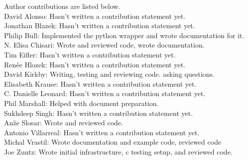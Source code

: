 Author contributions are listed below. \\
David Alonso: Hasn't written a contribution statement yet. \\
Jonathan Blazek: Hasn't written a contribution statement yet. \\
Philip Bull: Implemented the python wrapper and wrote documentation for it. \\
N. Elisa Chisari: Wrote and reviewed code, wrote documentation. \\
Tim Eifler: Hasn't written a contribution statement yet. \\
Ren\'ee Hlozek: Hasn't written a contribution statement yet. \\
David Kirkby: Writing, testing and reviewing code. asking questions. \\
Elisabeth Krause: Hasn't written a contribution statement yet. \\
C. Danielle Leonard: Hasn't written a contribution statement yet. \\
Phil Marshall: Helped with document preparation. \\
Sukhdeep Singh: Hasn't written a contribution statement yet. \\
An\v{z}e Slosar: Wrote and reviewed code. \\
Antonio Villarreal: Hasn't written a contribution statement yet. \\
Michal Vrastil: Wrote documentation and example code, reviewed code \\
Joe Zuntz: Wrote initial infrastructure, c testing setup, and reviewed code. \\

